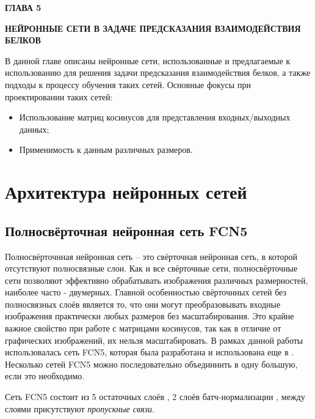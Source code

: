 \newpage
\begin{center}
	\textbf{\large ГЛАВА 5}

	\textbf{\large НЕЙРОННЫЕ СЕТИ В ЗАДАЧЕ ПРЕДСКАЗАНИЯ ВЗАИМОДЕЙСТВИЯ БЕЛКОВ}
\end{center}

В данной главе описаны нейронные сети, использованные и предлагаемые к использованию для решения задачи предсказания взаимодействия белков, а также подходы к процессу обучения таких сетей. Основные фокусы при проектировании таких сетей:
\begin{itemize}
\item Использование матриц косинусов для представления входных/выходных данных;
\item Применимость к данным различных размеров.
\end{itemize}

\section{Архитектура нейронных сетей}

\subsection{Полносвёрточная нейронная сеть FCN5}
Полносвёрточнная нейронная сеть\cite{fully_conv} -- это свёрточная нейронная сеть, в которой отсутствуют полносвязные слои. Как и все свёрточные сети, полносвёрточные сети позволяют эффективно обрабатывать изображения различных размерностей, наиболее часто - двумерных. Главной особенностью свёрточнных сетей без полносвязных слоёв является то, что они могут преобразовывать входные изображения практически любых размеров без масштабирования. Это крайне важное свойство при работе с матрицами косинусов, так как в отличие от графических изображений, их нельзя масштабировать. В рамках данной работы использовалась сеть FCN5, которая была разработана и использована еще в \cite{prip2023}. Несколько сетей FCN5 можно последовательно объединнить в одну большую, если это необходимо.

Сеть FCN5 состоит из 5 остаточных слоёв \cite{resnet}, 2 слоёв батч-нормализации \cite{batchnorm}, между слоями присутствуют \textit{пропускные связи}.

